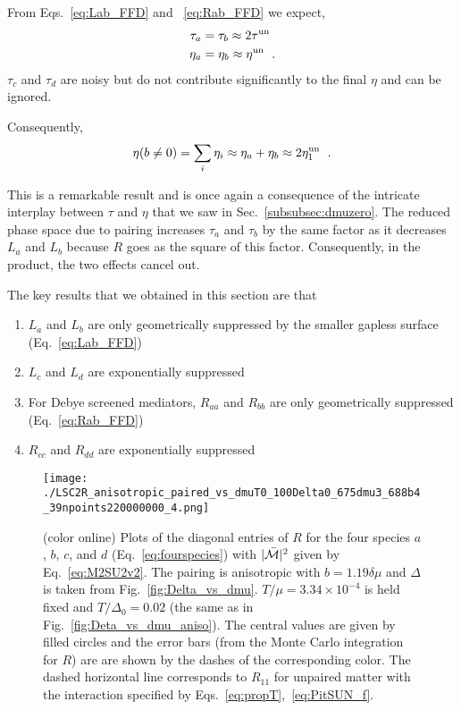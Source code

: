 \documentclass[10pt, aps, prd, superscriptaddress, nofootinbib, 
               amsmath, amssymb, twocolumn,
               preprintnumbers, showpacs,
               raggedbottom,
               floatfix]{revtex4-1}
\newcommand{\calM}{{\cal{M}}}
\newcommand{\un}{{\rm{un}}}
\begin{document}
From Eqs.~\ref{eq:Lab_FFD} and ~\ref{eq:Rab_FFD} we expect,
\begin{equation}
\begin{split}
\tau_{a}&=\tau_b \approx 2\tau^{\un}\\
\eta_{a}&=\eta_b \approx \eta^{\un}~\label{eq:etaab_FFD}\;.
\end{split}
\end{equation}
$\tau_{c}$ and $\tau_d$ are noisy but do not contribute significantly to the
final $\eta$ and can be ignored.

Consequently,
\begin{equation}
\eta(b\neq 0) = \sum_i \eta_i \approx \eta_a+\eta_b \approx 2\eta_1^{\un}
~\label{eq:eta_FFD}\;.
\end{equation}

This is a remarkable result and is once again a consequence of the intricate
interplay between $\tau$ and $\eta$ that we saw in
Sec.~\ref{subsubsec:dmuzero}. The reduced phase space due to pairing
increases $\tau_a$ and $\tau_b$ by the same factor as it decreases $L_{a}$ and
$L_{b}$ because $R$ goes as the square of this factor. Consequently, in the
product, the two effects cancel out.

The key results that we obtained in this section are that
\begin{enumerate}
\item{$L_a$ and $L_b$ are only geometrically suppressed by the smaller gapless
surface (Eq.~\ref{eq:Lab_FFD})}
\item{$L_c$ and $L_d$ are exponentially suppressed }
\item{For Debye screened mediators, $R_{aa}$ and $R_{bb}$ are only geometrically suppressed
(Eq.~\ref{eq:Rab_FFD})}
\item{$R_{cc}$ and $R_{dd}$ are exponentially suppressed }
\end{enumerate}

\begin{figure}[tbp]
\texttt{[image: ./LSC2R\_anisotropic\_paired\_vs\_dmuT0\_100Delta0\_675dmu3\_688b4\_39npoints220000000\_4.png]}
  \caption{(color online) Plots of the diagonal entries of $R$ for the four
  species $a$, $b$, $c$, and $d$ (Eq.~\ref{eq:fourspecies}) with
  $|\bar{\calM}|^2$ given by Eq.~\ref{eq:M2SU2v2}. The pairing is anisotropic
  with $b=1.19\delta\mu$ and $\Delta$ is taken from
  Fig.~\ref{fig:Delta_vs_dmu}. $T/\mu=3.34\times10^{-4}$ is held fixed and
  $T/\Delta_0=0.02$ (the same as in Fig.~\ref{fig:Deta_vs_dmu_aniso}). The
  central values are given by filled circles and the error bars (from the Monte
  Carlo integration for $R$) are are shown by the dashes of the corresponding
  color. The dashed horizontal line corresponds to $R_{11}$ for unpaired
  matter with the interaction specified by
  Eqs.~\ref{eq:propT},~\ref{eq:PitSUN_f}.  \label{fig:Leta_vs_dmu_aniso} }
  \end{figure}
\end{document}
